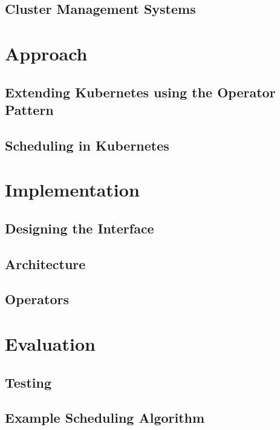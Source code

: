 \section{Cluster Management Systems}


\chapter{Approach}

\section{Extending Kubernetes using the Operator Pattern}

\section{Scheduling in Kubernetes}



\chapter{Implementation}
\section{Designing the Interface}

\section{Architecture}

\section{Operators}


\chapter{Evaluation}
\section{Testing}

\section{Example Scheduling Algorithm} \label{sec:exampleSchedulingAlgorithm}

